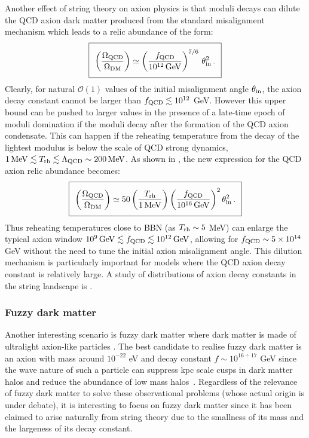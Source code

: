 Another effect of string theory on axion physics is that moduli decays can dilute the QCD axion dark matter produced from the standard misalignment mechanism which leads to a relic abundance of the form:
\begin{equation}
\setlength\fboxsep{0.25cm}
\setlength\fboxrule{0.4pt}
\boxed{
\left(\frac{\Omega_{\rm QCD}}{\Omega_{\rm DM}}\right)\simeq \left(\frac{f_{\rm QCD}}{10^{12}\,{\rm GeV}}\right)^{7/6}\,\theta_{\rm in}^2\,.
\label{QCDabundance}
}
\end{equation}
Clearly, for natural $\mathcal{O}(1)$ values of the initial misalignment angle $\theta_{\rm in}$, the axion decay constant cannot be larger than $f_{\rm QCD}\lesssim 10^{12}$ GeV. However this upper bound can be pushed to larger values in the presence of a late-time epoch of moduli domination if the moduli decay after the formation of the QCD axion condensate. This can happen if the reheating temperature from the decay of the lightest modulus is below the scale of QCD strong dynamics, $1\,{\rm MeV}\lesssim T_{\rm rh }\lesssim \Lambda_{\rm QCD}\sim 200\,{\rm MeV}$. As shown in \cite{Kawasaki:1995vt, Fox:2004kb}, the new expression for the QCD axion relic abundance becomes:
\begin{equation}
\setlength\fboxsep{0.25cm}
\setlength\fboxrule{0.4pt}
\boxed{
\left(\frac{\Omega_{\rm QCD}}{\Omega_{\rm DM}}\right)\simeq 50
\left(\frac{T_{\rm rh}}{1\,{\rm MeV}}\right)\left(\frac{f_{\rm QCD}}{10^{16}\,{\rm GeV}}\right)^2 \theta_{\rm in}^2\,.
}
\end{equation}
Thus reheating temperatures close to BBN (as $T_{\rm rh}\sim 5$ MeV) can enlarge the typical axion window $10^9\,{\rm GeV}\lesssim f_{\rm QCD}\lesssim 10^{12}\,{\rm GeV}$, allowing for $f_{\rm QCD}\sim 5\times 10^{14}$ GeV without the need to tune the initial axion misalignment angle. This dilution mechanism is particularly important for models where the QCD axion decay constant is relatively large. A study of
 distributions of axion decay constants in the string landscape is \cite{Broeckel:2021dpz}.

\subsubsection{Fuzzy dark matter}

Another interesting scenario is fuzzy dark matter where dark matter is made of ultralight axion-like particles \cite{Hu:2000ke,Schive:2014dra,Hui:2016ltb,Hui:2021tkt}. The best candidate to realise fuzzy dark matter is an axion with mass around $10^{-22}$ eV and decay constant $f\sim 10^{16\div 17}$ GeV since the wave nature of such a particle can suppress kpc scale cusps in dark matter halos and reduce the abundance of low mass halos~\cite{Schive:2014hza,Schive:2014dra,Hui:2016ltb}. Regardless of the relevance of fuzzy dark matter to solve these observational problems (whose actual origin is under debate), it is interesting to focus on fuzzy dark matter since it has been claimed to arise naturally from string theory due to the smallness of its mass and the largeness of its decay constant. 

